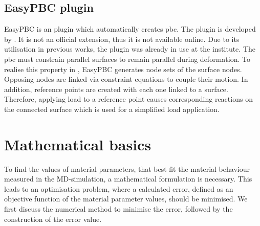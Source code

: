 \subsection{EasyPBC plugin} \label{subsec: EasPBC}

EasyPBC is an  plugin which automatically creates \acrshort{pbc}. The plugin is developed by \citet{omairey_development_2019}. It is not an official  extension, thus it is not available online. Due to its utilisation in previous works, the plugin was already in use at the institute. The \acrshort{pbc} must constrain parallel surfaces to remain parallel during deformation. To realise this property in , EasyPBC generates node sets of the surface nodes. Opposing nodes are linked via constraint equations to couple their motion. In addition, reference points are created with each one linked to a surface. Therefore, applying load to a reference point causes corresponding reactions on the connected surface which is used for a simplified load application. 








\section{Mathematical basics} \label{sec: mathematics}

To find the values of material parameters, that best fit the material behaviour measured in the MD-simulation, a mathematical formulation is necessary. This leads to an optimisation problem, where a calculated error, defined as an objective function of the material parameter values, should be minimised. We first discuss the numerical method to minimise the error, followed by the construction of the error value.

